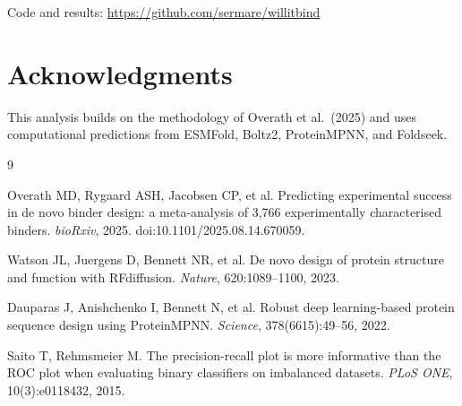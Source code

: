 \documentclass[11pt,a4paper]{article}
\begin{document}
Code and results: \url{https://github.com/sermare/willitbind}

\section*{Acknowledgments}

This analysis builds on the methodology of Overath et al.\ (2025) and uses computational predictions from ESMFold, Boltz2, ProteinMPNN, and Foldseek.



\begin{thebibliography}{9}

Overath MD, Rygaard ASH, Jacobsen CP, et al.
\newblock Predicting experimental success in de novo binder design: a meta-analysis of 3,766 experimentally characterised binders.
\newblock \textit{bioRxiv}, 2025.
\newblock doi:10.1101/2025.08.14.670059.

Watson JL, Juergens D, Bennett NR, et al.
\newblock De novo design of protein structure and function with {RFdiffusion}.
\newblock \textit{Nature}, 620:1089--1100, 2023.

Dauparas J, Anishchenko I, Bennett N, et al.
\newblock Robust deep learning-based protein sequence design using {ProteinMPNN}.
\newblock \textit{Science}, 378(6615):49--56, 2022.

Saito T, Rehmsmeier M.
\newblock The precision-recall plot is more informative than the {ROC} plot when evaluating binary classifiers on imbalanced datasets.
\newblock \textit{PLoS ONE}, 10(3):e0118432, 2015.

\end{thebibliography}
\end{document}
